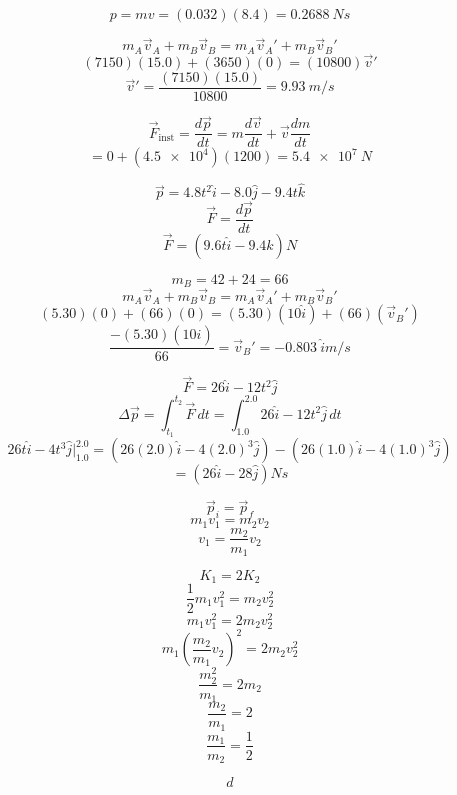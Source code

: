 \documentclass[11pt]{homework}
\begin{document}
\maketitle

\renewcommand{\questiontype}{Problem}
\setcounter{questionCounter}{0}

\question
\[
p=mv=(0.032)(8.4)=\boxed{\qty{0.2688}{Ns}}
\]


\question
\[
m_{A}\vec{v}_{A}+m_{B}\vec{v}_{B}=
m_{A}\vec{v}_{A}'+m_{B}\vec{v}_{B}'
\]
\[
    (7150)(15.0) + (3650)(0) = (10800)\vec{v}'
\]
\[
\vec{v}'=\frac{(7150)(15.0)}{10800} = \boxed{\qty{9.93}{m/s}}
\]


\setcounter{questionCounter}{3}
\question
\[
\vec{F}_{\text{inst}}=\frac{d\vec{p}}{dt} =m \frac{d\vec{v}}{dt}+\vec{v} \frac{dm}{dt} 
\]
\[
    =0 + (\qty{4.5e4})(1200) = \boxed{\qty{5.4e7}{N}}
\]


\question
\[
\vec{p}=4.8t^2 \hat{i} - 8.0 \hat{j}-9.4 t \hat{k}
\]
\[
\vec{F}= \frac{d \vec{p}}{dt}
\]
\[
    \vec{F} =  \boxed{(9.6t \hat{i} - 9.4 \hat{k})\unit{N}}
\]



\question
\[
m_B = 42 + 24 = 66
\]
\[
m_{A}\vec{v}_{A}+m_{B}\vec{v}_{B}=
m_{A}\vec{v}_{A}'+m_{B}\vec{v}_{B}'
\]
\[
(5.30)(0) + (66)(0) = (5.30)(10 \hat{i}) + (66)(\vec{v}_B')
\]
\[
\frac{-(5.30)(10 \hat{i})}{66} = \vec{v}_B' = \boxed{\qty{-0.803}{\hat{i} m /s}}
\]


\setcounter{questionCounter}{7}
\question
\[
\vec{F}=26 \hat{i} - 12 t^2 \hat{j} 
\]
\[
    \Delta \vec{p}=\int_{t_{1}}^{t_{2}} \vec{F}\,dt = \int_{1.0}^{2.0} 26 \hat{i} - 12 t^2 \hat{j} \, dt
\]
\[
    26 t \hat{i} - 4 t^3 \hat{j} \Big|^{2.0}_{1.0}=(26(2.0)\hat{i} - 4(2.0)^3 \hat{j})-(26(1.0)\hat{i} - 4(1.0)^3 \hat{j})
\]
\[
    = \boxed{ (26 \hat{i} - 28 \hat{j}) \unit{Ns}}
\]


\question
\[
\vec{p}_i = \vec{p}_f
\]
\[
m_1v_1 = m_2v_2
\]
\[
v_1 = \frac{m_2}{m_1}v_2
\]

\[
K_1 = 2K_2
\]
\[
\frac{1}{2}m_1v_1^2 = m_2v_2^2
\]
\[
m_1v_1^2 = 2m_2v_2^2
\]
\[
m_1\left(\frac{m_2}{m_1}v_2\right)^2 = 2m_2v_2^2
\]
\[
\frac{m_2^2}{m_1}=2m_2
\]
\[
\frac{m_2}{m_1} = 2
\]
\[
    \frac{m_1}{m_2} = \boxed{\frac{1}{2}}    
\]


\setcounter{questionCounter}{17}
\question
\[
d
\]


\setcounter{questionCounter}{20}
\question


\setcounter{questionCounter}{22}
\question


\setcounter{questionCounter}{27}
\question


\setcounter{questionCounter}{36}
\question


\question


\setcounter{questionCounter}{46}
\question


\setcounter{questionCounter}{53}
\question


\question
\end{document}
